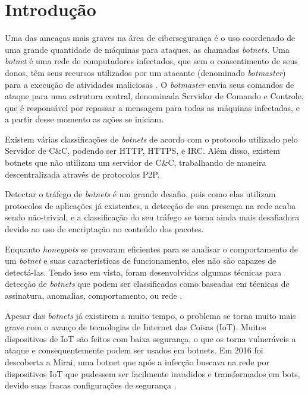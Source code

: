 \chapter{Introdução}
\label{c.introducao}

Uma das ameaças mais graves na área de cibersegurança é o uso coordenado de uma grande quantidade de máquinas para ataques, as chamadas \textit{botnets}. Uma \textit{botnet} é uma rede de computadores infectados, que sem o consentimento de seus donos, têm seus recursos utilizados por um atacante (denominado \textit{botmaster}) para a execução de atividades maliciosas \cite{miller2016role}. O \textit{botmaster} envia seus comandos de ataque para uma estrutura central, denominada Servidor de Comando e Controle, que é responsável por repassar a mensagem para todas as máquinas infectadas, e a partir desse momento as ações se iniciam.

Existem várias classificações de \textit{botnets} de acordo com o protocolo utilizado pelo Servidor de C\&C, podendo ser HTTP, HTTPS, e IRC. Além disso, existem botnets que não utilizam um servidor de C\&C, trabalhando de maneira descentralizada através de protocolos P2P. 

Detectar o tráfego de \textit{botnets} é um grande desafio, pois como elas utilizam protocolos de aplicações já existentes, a detecção de sua presença na rede acaba sendo não-trivial, e a classificação do seu tráfego se torna ainda mais desafiadora devido ao uso de encriptação no conteúdo dos pacotes. \cite{lu2008botnets}
	
Enquanto \textit{honeypots} se provaram eficientes para se analisar o comportamento de um \textit{botnet} e suas características de funcionamento, eles não são capazes de detectá-las. Tendo isso em vista, foram desenvolvidas algumas técnicas para detecção de \textit{botnets} que podem ser classificadas como baseadas em técnicas de assinatura, anomalias, comportamento, ou rede \cite{asha2016analysis}.

Apesar das \textit{botnets} já existirem a muito tempo, o problema se torna muito mais grave com o avanço de tecnologias de Internet das Coisas (IoT). Muitos dispositivos de IoT são feitos com baixa segurança, o que os torna vulneráveis a ataque e consequentemente podem ser usados em botnets. Em 2016 foi descoberta a Mirai, uma botnet que após a infecção buscava na rede por dispositivos IoT que pudessem ser facilmente invadidos e transformados em bots, devido suas fracas configurações de segurança \cite{kambourakis2017mirai}. 

